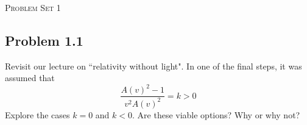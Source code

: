 	\begin{center}
		{
			\vspace*{3in}
			\LARGE
			\textsc{
				Problem Set 1
			}
		}
	\end{center}
	\newpage
	\subsection*{
		Problem 1.1
	}
	\begin{problem}
		Revisit our lecture on ``relativity without light". 
		In one of the final steps, it was assumed that
		\begin{equation}
			\label{eq:1.1}
		    \frac{A(v)^2-1}{v^2 A(v)^2} = k > 0 
		\end{equation}
		Explore the cases $k = 0$ and $k < 0$. 
		Are these viable options? Why or why not?
	\end{problem}
